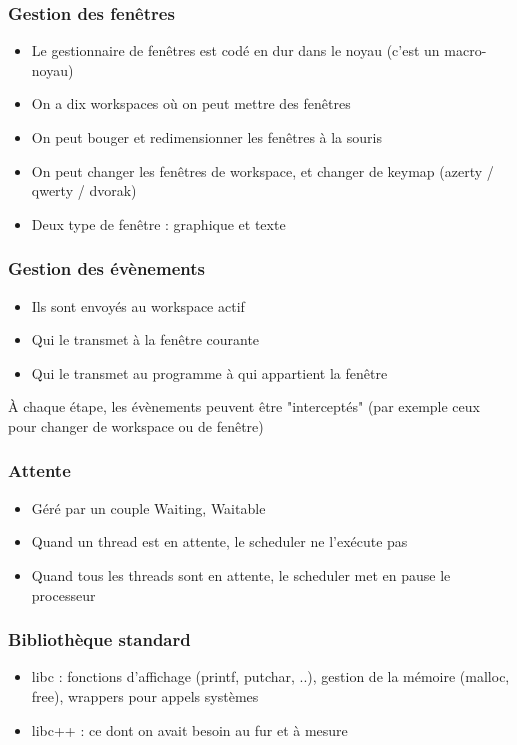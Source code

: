 \documentclass{beamer}
\begin{document}
\begin{frame}
    \frametitle{Gestion des fenêtres}
    \begin{itemize}
        \item Le gestionnaire de fenêtres est codé en dur dans le noyau (c'est un macro-noyau)
        \item On a dix workspaces où on peut mettre des fenêtres
        \item On peut bouger et redimensionner les fenêtres à la souris
        \item On peut changer les fenêtres de workspace, et changer de keymap (azerty / qwerty / dvorak)
        \item Deux type de fenêtre : graphique et texte
    \end{itemize}
\end{frame}

\begin{frame}
    \frametitle{Gestion des évènements}
    \begin{itemize}
        \item Ils sont envoyés au workspace actif
        \item Qui le transmet à la fenêtre courante
        \item Qui le transmet au programme à qui appartient la fenêtre
    \end{itemize}
    À chaque étape, les évènements peuvent être "interceptés" (par exemple ceux pour changer de workspace ou de fenêtre)
\end{frame}

\begin{frame}
    \frametitle{Attente}
    \begin{itemize}
        \item Géré par un couple Waiting, Waitable
        \item Quand un thread est en attente, le scheduler ne l'exécute pas
        \item Quand tous les threads sont en attente, le scheduler met en pause le processeur
    \end{itemize}
\end{frame}

\begin{frame}
    \frametitle{Bibliothèque standard}
    \begin{itemize}
        \item libc : fonctions d'affichage (printf, putchar, ..), gestion de la mémoire (malloc, free), wrappers pour appels systèmes
        \item libc++ : ce dont on avait besoin au fur et à mesure
    \end{itemize}
\end{frame}
\end{document}
